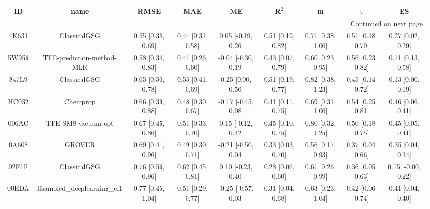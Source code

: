 \documentclass{article}
\begin{document}
\begin{center}
\scriptsize
\begin{longtable}{|ccccccccc|}
\toprule
    ID &                                    name &               RMSE &                MAE &                    ME &              R$^2$ &                     m &                $\tau$ &                    ES \\
\midrule
\endhead
\midrule
\multicolumn{9}{r}{{Continued on next page}} \\
\midrule
\endfoot

\bottomrule
\endlastfoot
 4K631 &                            ClassicalGSG &  0.55 [0.38, 0.69] &  0.44 [0.31, 0.58] &    0.05 [-0.19, 0.26] &  0.51 [0.19, 0.82] &     0.71 [0.38, 1.06] &     0.51 [0.18, 0.79] &     0.27 [0.02, 0.29] \\
 5W956 &               TFE-prediction-method-MLR &  0.58 [0.34, 0.83] &  0.41 [0.26, 0.60] &   -0.04 [-0.30, 0.19] &  0.43 [0.07, 0.79] &     0.60 [0.23, 0.95] &     0.56 [0.23, 0.82] &     0.71 [0.13, 0.58] \\
 847L9 &                            ClassicalGSG &  0.65 [0.50, 0.78] &  0.55 [0.41, 0.69] &     0.25 [0.00, 0.50] &  0.51 [0.19, 0.77] &     0.82 [0.38, 1.23] &     0.45 [0.14, 0.72] &     0.13 [0.00, 0.19] \\
 HC032 &                                Chemprop &  0.66 [0.39, 0.88] &  0.48 [0.30, 0.67] &   -0.17 [-0.45, 0.08] &  0.41 [0.11, 0.75] &     0.69 [0.31, 1.06] &     0.54 [0.25, 0.81] &     0.46 [0.06, 0.41] \\
 006AC &                      TFE-SM8-vacuum-opt &  0.67 [0.46, 0.86] &  0.51 [0.33, 0.70] &    0.15 [-0.12, 0.42] &  0.45 [0.10, 0.75] &     0.80 [0.32, 1.25] &     0.50 [0.18, 0.75] &     0.45 [0.05, 0.41] \\
 0A608 &                                  GROVER &  0.69 [0.41, 0.96] &  0.49 [0.30, 0.71] &   -0.21 [-0.50, 0.04] &  0.33 [0.03, 0.70] &     0.56 [0.17, 0.93] &     0.37 [0.04, 0.66] &     0.35 [0.04, 0.34] \\
 02F1F &                            ClassicalGSG &  0.76 [0.56, 0.96] &  0.62 [0.45, 0.81] &    0.10 [-0.23, 0.40] &  0.28 [0.06, 0.60] &     0.61 [0.26, 0.99] &     0.36 [0.05, 0.63] &    0.15 [-0.00, 0.22] \\
 00EDA &            ffsampled\_deeplearning\_cl1 &  0.77 [0.45, 1.04] &  0.51 [0.29, 0.77] &   -0.25 [-0.57, 0.03] &  0.31 [0.04, 0.68] &     0.63 [0.23, 1.04] &     0.42 [0.06, 0.74] &     0.41 [0.04, 0.40] \\

\end{longtable}
\end{center}
\end{document}
